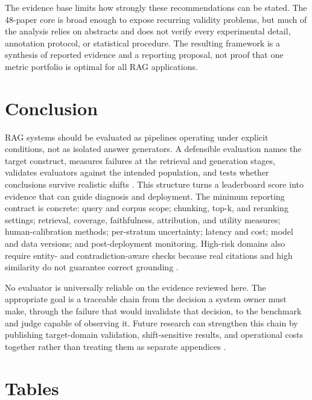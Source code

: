 \documentclass[a4paper,11pt]{article}
\begin{document}
The evidence base limits how strongly these recommendations can be stated. The 48-paper core is broad enough to expose recurring validity problems, but much of the analysis relies on abstracts and does not verify every experimental detail, annotation protocol, or statistical procedure. The resulting framework is a synthesis of reported evidence and a reporting proposal, not proof that one metric portfolio is optimal for all RAG applications.
\section{Conclusion}


RAG systems should be evaluated as pipelines operating under explicit conditions, not as isolated answer generators. A defensible evaluation names the target construct, measures failures at the retrieval and generation stages, validates evaluators against the intended population, and tests whether conclusions survive realistic shifts \citep{Muthyam2026Systems,SaadFalcon2023Ares,Ding2026Attribution}. This structure turns a leaderboard score into evidence that can guide diagnosis and deployment. The minimum reporting contract is concrete: query and corpus scope; chunking, top-k, and reranking settings; retrieval, coverage, faithfulness, attribution, and utility measures; human-calibration methods; per-stratum uncertainty; latency and cost; model and data versions; and post-deployment monitoring. High-risk domains also require entity- and contradiction-aware checks because real citations and high similarity do not guarantee correct grounding \citep{Caruzzo2026Deceptive,Javadi2025Contradictions}.

No evaluator is universally reliable on the evidence reviewed here. The appropriate goal is a traceable chain from the decision a system owner must make, through the failure that would invalidate that decision, to the benchmark and judge capable of observing it. Future research can strengthen this chain by publishing target-domain validation, shift-sensitive results, and operational costs together rather than treating them as separate appendices \citep{Cahoon2025Optimizing,Zhou2024Trustworthiness,Brehme2025Retrieval}.
\appendix

\section{Tables}
\end{document}
